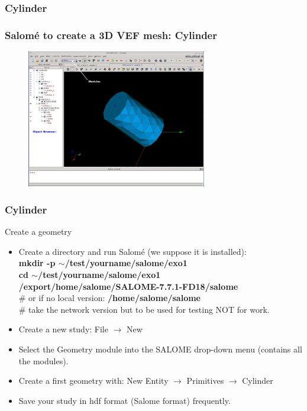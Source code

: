 \documentclass[10pt]{beamer}
\begin{document}
\subsubsection{Cylinder}
\begin{frame}
\frametitle{Salom\'e to create a 3D VEF mesh: Cylinder}

\begin{figure}
\includegraphics[width=0.7\textwidth]{PICTURES/salome1_2.jpg}
\end{figure}

\end{frame}
\begin{frame}
\frametitle{Cylinder}
\begin{block}{Create a geometry}

\begin{itemize}
\item Create a directory and run Salom\'e (we suppose it is installed):\\
\textbf{mkdir -p $\sim$/test/yourname/salome/exo1} \\
\textbf{cd $\sim$/test/yourname/salome/exo1} \\

\textbf{/export/home/salome/SALOME-7.7.1-FD18/salome} \\
\# or if no local version: {\scriptsize{\textbf{/home/salome/salome}}} \\
\# take the network version but to be used for testing NOT for work.

\item Create a new study: File $\rightarrow$ New

\item Select the Geometry module into the SALOME drop-down menu (contains all the modules).

\item Create a first geometry with: New Entity $\rightarrow$ Primitives $\rightarrow$ Cylinder
\item Save your study in hdf format (Salome format) frequently.
\end{itemize}

\end{block}
\end{frame}
\end{document}

